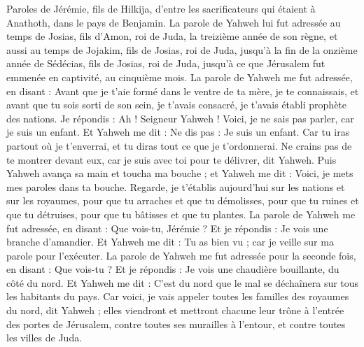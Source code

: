 \BFont
\begin{multicols}{2}
\VerseOne{}Paroles de Jérémie, fils de Hilkija, d'entre les sacrificateurs qui étaient à Anathoth, dans le pays de Benjamin.
La parole de Yahweh lui fut adressée au temps de Josias, fils d'Amon, roi de Juda, la treizième année de son règne,
et aussi au temps de Jojakim, fils de Josias, roi de Juda, jusqu’à la fin de la onzième année de Sédécias, fils de Josias, roi de Juda, jusqu’à ce que Jérusalem fut emmenée en captivité, au cinquième mois.
La parole de Yahweh me fut adressée, en disant :
Avant que je t’aie formé dans le ventre de ta mère, je te connaissais, et avant que tu sois sorti de son sein, je t'avais consacré, je t'avais établi prophète des nations.
Je répondis : Ah ! Seigneur Yahweh ! Voici, je ne sais pas parler, car je suis un enfant.
Et Yahweh me dit : Ne dis pas : Je suis un enfant. Car tu iras partout où je t'enverrai, et tu diras tout ce que je t’ordonnerai.
Ne crains pas de te montrer devant eux, car je suis avec toi pour te délivrer, dit Yahweh.
Puis Yahweh avança sa main et toucha ma bouche ; et Yahweh me dit : Voici, je mets mes paroles dans ta bouche.
Regarde, je t'établis aujourd'hui sur les nations et sur les royaumes, pour que tu arraches et que tu démolisses, pour que tu ruines et que tu détruises, pour que tu bâtisses et que tu plantes.
La parole de Yahweh me fut adressée, en disant : Que vois-tu, Jérémie ? Et je répondis : Je vois une branche d'amandier.
Et Yahweh me dit : Tu as bien vu ; car je veille sur ma parole pour l’exécuter.
La parole de Yahweh me fut adressée pour la seconde fois, en disant : Que vois-tu ? Et je répondis : Je vois une chaudière bouillante, du côté du nord.
Et Yahweh me dit : C’est du nord que le mal se déchaînera sur tous les habitants du pays.
Car voici, je vais appeler toutes les familles des royaumes du nord, dit Yahweh ; elles viendront et mettront chacune leur trône à l'entrée des portes de Jérusalem, contre toutes ses murailles à l'entour, et contre toutes les villes de Juda.

\end{multicols}
